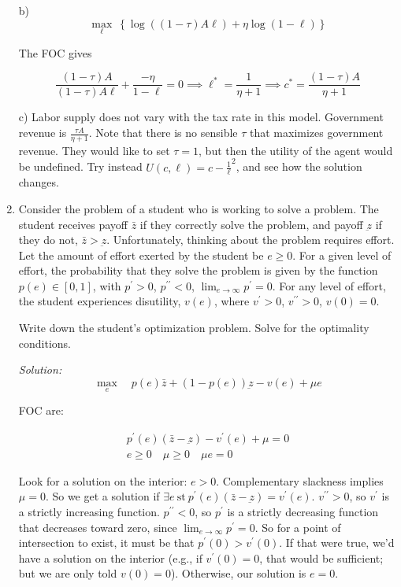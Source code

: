 \documentclass[12pt]{article}
\newif\ifsln
\begin{document}
\begin{enumerate}[1.]
b) \[ \underset{\ell}{\max} \ \left\{ \log((1-\tau)A\ell) + \eta \log(1-\ell)  \right\}\]

The FOC gives 

\[\frac{(1-\tau)A}{(1-\tau)A\ell} + \frac{-\eta}{1-\ell} = 0 \implies \ell^{*} = \frac{1}{\eta + 1} \implies c^{*} = \frac{(1-\tau)A}{\eta + 1}\]
\medskip

c) Labor supply does not vary with the tax rate in this model. Government revenue is $\frac{\tau A}{\eta + 1}$. Note that there is no sensible $\tau$ that maximizes government revenue. They would like to set $\tau = 1$, but then the utility of the agent would be undefined. Try instead $U(c, \ell) = c - \frac{1}{\ell}^{2}$, and see how the solution changes.
\fi

\item Consider the problem of a student who is working to solve a problem. The student receives payoff $\bar{z}$ if they correctly solve the problem, and payoff $\underbar{z}$ if they do not, $\bar{z} > \underbar{z}$. Unfortunately, thinking about the problem requires effort. Let the amount of effort exerted by the student be $e \geq 0$. For a given level of effort, the probability that they solve the problem is given by the function $p(e) \in [0, 1]$, with $p^{\prime} > 0$, $p^{\prime\prime} < 0$, $\lim_{e\to\infty} p^{\prime} = 0$. For any level of effort, the student experiences disutility, $v(e)$, where $v^{\prime} > 0$, $v^{\prime\prime} > 0$, $v(0) = 0$.\smallskip

Write down the student's optimization problem. Solve for the optimality conditions.

\ifsln
\textit{Solution:}\\
\[\underset{e}{\max} \quad p(e)\bar{z} + (1-p(e))\underbar{z} - v(e) + \mu e\]
\medskip

FOC are:

\begin{gather*}
p^{\prime}(e) (\bar{z} - \underbar{z}) - v^{\prime}(e) + \mu = 0\\
e\geq 0 \quad \mu \geq 0 \quad \mu e = 0
\end{gather*}

Look for a solution on the interior: $e > 0$. Complementary slackness implies $\mu = 0$. So we get a solution if $\exists e \ \text{st} \ p^{\prime}(e)(\bar{z} - \underbar{z}) = v^{\prime}(e)$. $v^{\prime\prime} > 0$, so $v^{\prime}$ is a strictly increasing function. $p^{\prime\prime} < 0$, so $p^{\prime}$ is a strictly decreasing function that decreases toward zero, since $\lim_{e\to\infty}p^{\prime} = 0$. So for a point of intersection to exist, it must be that $p^{\prime}(0) > v^{\prime}(0)$. If that were true, we'd have a solution on the interior (e.g., if $v^{\prime}(0) = 0$, that would be sufficient; but we are only told $v(0) = 0$). Otherwise, our solution is $e = 0$.


\end{enumerate}
\end{document}
